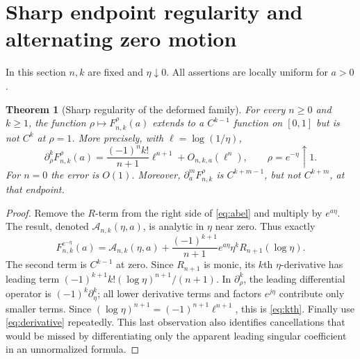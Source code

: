 \documentclass[11pt,letterpaper]{article}
\numberwithin{equation}{section}
\newtheorem{theorem}{Theorem}[section]
\theoremstyle{definition}\newtheorem{definition}[theorem]{Definition}
\theoremstyle{remark}\newtheorem{remark}[theorem]{Remark}
\newcommand{\F}[3]{F_{#1,#2}^{#3}}
\begin{document}
\section{Sharp endpoint regularity and alternating zero motion}\label{sec:endpoint}
In this section $n,k$ are fixed and $\eta\downarrow0$. All assertions are locally uniform for $a>0$.

\begin{theorem}[Sharp regularity of the deformed family]\label{thm:regularity}
For every $n\ge0$ and $k\ge1$, the function $\rho\mapsto\F nk\rho(a)$ extends to a $C^{k-1}$ function on $[0,1]$ but is not $C^k$ at $\rho=1$. More precisely, with $\ell=\log(1/\eta)$,
\begin{equation}\label{eq:kth}
 \partial_\rho^k\F nk\rho(a)
 =\frac{(-1)^n k!}{n+1}\ell^{n+1}+O_{n,k,a}(\ell^n),
 \qquad \rho=e^{-\eta}\uparrow1.
\end{equation}
For $n=0$ the error is $O(1)$. Moreover, $\partial_a^m\F nk\rho$ is $C^{k+m-1}$, but not $C^{k+m}$, at that endpoint.
\end{theorem}
\begin{proof}
Remove the $R$-term from the right side of \eqref{eq:abel} and multiply by $e^{a\eta}$. The result, denoted $\mathcal A_{n,k}(\eta,a)$, is analytic in $\eta$ near zero. Thus exactly
\begin{equation}\label{eq:analytic-split}
 \F nk{e^{-\eta}}(a)=\mathcal A_{n,k}(\eta,a)
 +\frac{(-1)^{k+1}}{n+1}e^{a\eta}\eta^k R_{n+1}(\log\eta).
\end{equation}
The second term is $C^{k-1}$ at zero. Since $R_{n+1}$ is monic, its $k$th $\eta$-derivative has leading term
$(-1)^{k+1}k!(\log\eta)^{n+1}/(n+1)$. In $\partial_\rho^k$, the leading differential operator is $(-1)^k\partial_\eta^k$; all lower derivative terms and factors $e^{j\eta}$ contribute only smaller terms. Since $(\log\eta)^{n+1}=(-1)^{n+1}\ell^{n+1}$, this is \eqref{eq:kth}. Finally use \eqref{eq:derivative} repeatedly. This last observation also identifies cancellations that would be missed by differentiating only the apparent leading singular coefficient in an unnormalized formula.
\end{proof}
\end{document}
